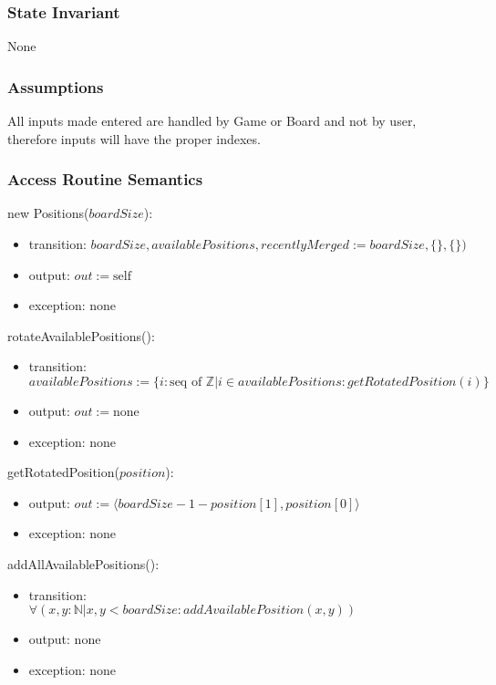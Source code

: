 \documentclass[12pt]{article}
\begin{document}
\subsubsection* {State Invariant}

None

\subsubsection* {Assumptions}

All inputs made entered are handled by Game or Board and not by user, therefore inputs will have the proper indexes.

\subsubsection* {Access Routine Semantics}

\noindent new Positions($\mathit{boardSize}$):
\begin{itemize}
\item transition: $\mathit{boardSize}, availablePositions, recentlyMerged := \mathit{boardSize}, \{\}, \{\})$
\item output: $out := \mbox{self}$
\item exception: none
\end{itemize}

\noindent rotateAvailablePositions():
\begin{itemize}
\item transition: \\
    $availablePositions := \{i: \text{seq of } \mathbb{Z} | i \in availablePositions :
    getRotatedPosition(i)\}$
\item output: $out := \text{none}$
\item exception: none
\end{itemize}

\noindent getRotatedPosition($position$):
\begin{itemize}

\item output: $out := \langle boardSize - 1 - position[1], position[0] \rangle$
\item exception: none
\end{itemize}

\noindent addAllAvailablePositions():
\begin{itemize}
\item transition: \\
    $\forall (x, y: \mathbb{N}| x, y < boardSize: addAvailablePosition(x, y))$
\item output: none
\item exception: none
\end{itemize}
\end{document}
